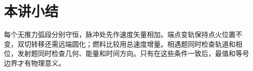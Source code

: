 \section{本讲小结}
每个无推力弧段分别守恒，脉冲处先作速度矢量相加。端点变轨保持点火位置不变，双切转移还需远端圆化；燃料比较用总速度增量。相遇题同时检查轨道和相位，发射题同时检查几何、能量和时间方向。只有在这些条件一致后，最值和等号边界才有物理意义。

